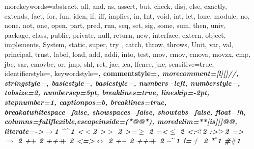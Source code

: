 {morekeywords={abstract, all, and, as, assert, but, check, disj, else, exactly, extends, fact, for, fun, iden, if, iff, implies, in, Int, void, int, let, lone, module, no, none, not, one, open, part, pred, run, seq, set, sig, some, sum, then, univ, package, class, public, private, null, return, new, interface, extern, object, implements, System, static, super, try , catch, throw, throws, Unit, var, val, principal, trust, label, load, add, addi, into, test, mov, cmov, cmova, movzx, cmp, jbe, sar, cmovbe, or, jmp, shl, ret, jae, lea, lfence, jne},
sensitive=true,
identifierstyle=\color{\ulccol},
keywordstyle=\bfseries\color{\ulccol},
commentstyle=\itshape\color{purple!40!black},
morecomment=[l][\small\itshape\color{purple!40!black}]{//},
stringstyle=\color{orange},
basicstyle=\small,
basicstyle={\small},
numbers=left,
numberstyle=\tiny\color{mygray},
tabsize=2,
numbersep=5pt,
breaklines=true,
lineskip=-2pt,
stepnumber=1,
captionpos=b,
breaklines=true,
breakatwhitespace=false,
showspaces=false,
showtabs=false,
float=!h,
columns=fullflexible,escapeinside={(*@}{@*)},
moredelim=**[is][\color{red!60}]{@}{@},
literate={->}{{$\to$}}1 {^}{{$\mspace{-3mu}\widehat{\quad}\mspace{-3mu}$}}1
{<}{$<$}2 {>}{$>$ }2 {>=}{$\geq$ }2 {=<}{$\leq$ }2
{<:}{{$<\mspace{-3mu}:$}}2 {:>}{{$:\mspace{-3mu}>$}}2
{=>}{{$\Rightarrow$ }}2 {+}{$+$ }2 {++}{{$+\mspace{-8mu}+$ }}2
{<=>}{{$\Leftrightarrow$ }}2 {+}{$+$ }2 {++}{{$+\mspace{-8mu}+$ }}2
{\~}{{$\mspace{-3mu}\widetilde{\quad}\mspace{-3mu}$}}1
{!=}{$\neq$ }2 {*}{${}^{\ast}$}1 %
{\#}{$\#$}1
}
\lstset{language=General,numbersep=5pt,frame=single}%


\DeclareMathOperator\ceq{\ensuremath{\mathrel{\simeq_{\mi{ctx}}}}}
\DeclareMathOperator\nceq{\mathrel{\nsimeq_{\mi{ctx}}}}

\DeclareMathOperator\ceqs{\src{\ceq}}
\DeclareMathOperator\ceqt{\trg{\ceq}}
\DeclareMathOperator\ceqc{\com{\ceq}}

